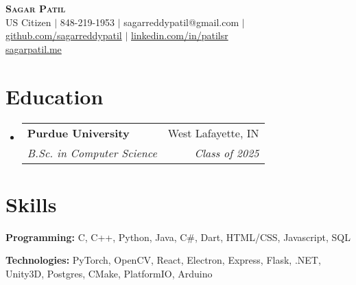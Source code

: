 \documentclass[letterpaper,11pt]{article}
\makeatletter
\newcommand{\resumeSubheading}[4]{
  \vspace{-2pt}\item
    \begin{tabular*}{0.97\textwidth}[t]{l@{\extracolsep{\fill}}r}
      \textbf{#1} & #2 \\
      \textit{\small#3} & \textit{\small #4} \\
    \end{tabular*}\vspace{-7pt}
}
\newcommand{\resumeSubHeadingListStart}{\begin{itemize}[leftmargin=0.15in, label={}]}
\newcommand{\resumeSubHeadingListEnd}{\end{itemize}}
\makeatother
\begin{document}

\begin{center}
  \textbf{\Huge \scshape Sagar Patil} \\ \vspace{3pt}
  \small
  US Citizen
  $|$
  \faMobile \hspace{.5pt} 848-219-1953
  $|$
  \faAt \hspace{.5pt} sagarreddypatil@gmail.com
  $|$
  \faGithub \hspace{.5pt} \href{https://www.github.com/sagarreddypatil}{github.com/sagarreddypatil}
  $|$
  \faLinkedinSquare \hspace{.5pt} \href{https://www.linkedin.com/in/patilsr}{linkedin.com/in/patilsr}
  \\ %
  \faGlobe \hspace{.5pt} \href{https://sagarpatil.me}{sagarpatil.me}
\end{center}




\section{Education}
\vspace{3pt}
\resumeSubHeadingListStart

\resumeSubheading
{Purdue University}{West Lafayette, IN}
{B.Sc. in Computer Science}{Class of 2025}

\resumeSubHeadingListEnd



\section{Skills}
\vspace{2pt}
\resumeSubHeadingListStart
\small{\item{
              \textbf{Programming: }{C, C++, Python, Java, C\#, Dart, HTML/CSS, Javascript, SQL} \\ \vspace{3pt}

              \textbf{Technologies: }{PyTorch, OpenCV, React, Electron, Express, Flask, .NET, Unity3D, Postgres, CMake, PlatformIO, Arduino} \\ \vspace{3pt}

        }}
\resumeSubHeadingListEnd
\end{document}
